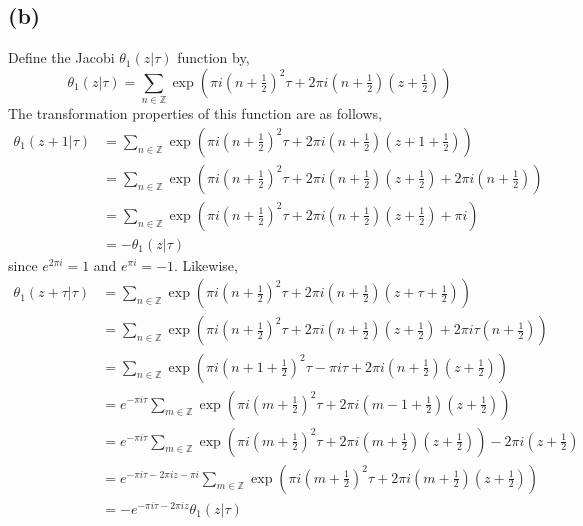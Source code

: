 \documentclass[12pt]{extarticle}
\newcommand{\Z}{\mathbb{Z}}
\theoremstyle{definition}
\begin{document}
\subsection*{(b)}

Define the Jacobi $\theta_1(z|\tau)$ function by,
\[ \theta_1(z | \tau) = \sum_{n \in \Z} \exp{\left( \pi i (n + \tfrac{1}{2})^2 \tau + 2 \pi i (n + \tfrac{1}{2})(z + \tfrac{1}{2}) \right)} \]
The transformation properties of this function are as follows,
\begin{align*}
\theta_1(z + 1 | \tau) & = \sum_{n \in \Z} \exp{\left( \pi i (n + \tfrac{1}{2})^2 \tau + 2 \pi i (n + \tfrac{1}{2})(z + 1 + \tfrac{1}{2}) \right)}
\\
& = \sum_{n \in \Z} \exp{\left( \pi i (n + \tfrac{1}{2})^2 \tau + 2 \pi i (n + \tfrac{1}{2})(z + \tfrac{1}{2}) + 2 \pi i (n + \tfrac{1}{2}) \right)}
\\
& = \sum_{n \in \Z} \exp{\left( \pi i (n + \tfrac{1}{2})^2 \tau + 2 \pi i (n + \tfrac{1}{2})(z + \tfrac{1}{2}) + \pi i \right)}
\\
& = - \theta_1(z | \tau)
\end{align*}
since $e^{2\pi i} = 1$ and $e^{\pi i} = - 1$. Likewise,
\begin{align*}
\theta_1(z + \tau | \tau) & = \sum_{n \in \Z} \exp{\left( \pi i (n + \tfrac{1}{2})^2 \tau + 2 \pi i (n + \tfrac{1}{2})(z + \tau + \tfrac{1}{2}) \right)}
\\
& = \sum_{n \in \Z} \exp{\left( \pi i (n + \tfrac{1}{2})^2 \tau + 2 \pi i (n + \tfrac{1}{2})(z + \tfrac{1}{2}) + 2 \pi i \tau (n + \tfrac{1}{2}) \right)}
\\
& = \sum_{n \in \Z} \exp{\left( \pi i (n + 1 + \tfrac{1}{2})^2 \tau - \pi i \tau + 2 \pi i (n + \tfrac{1}{2})(z + \tfrac{1}{2})  \right)}
\\
& = e^{- \pi i \tau} \sum_{m \in \Z} \exp{\left( \pi i (m + \tfrac{1}{2})^2 \tau + 2 \pi i (m - 1 + \tfrac{1}{2})(z + \tfrac{1}{2})  \right)}
\\
& = e^{- \pi i \tau} \sum_{m \in \Z} \exp{\left( \pi i (m + \tfrac{1}{2})^2 \tau + 2 \pi i (m + \tfrac{1}{2})(z + \tfrac{1}{2})  \right) - 2 \pi i (z + \tfrac{1}{2}) }
\\
& = e^{- \pi i \tau - 2 \pi i z - \pi i} \sum_{m \in \Z} \exp{\left( \pi i (m + \tfrac{1}{2})^2 \tau + 2 \pi i (m + \tfrac{1}{2})(z + \tfrac{1}{2})  \right) }
\\
& = - e^{- \pi i \tau - 2 \pi i z} \theta_1(z | \tau)
\end{align*}
\end{document}
